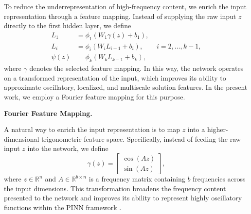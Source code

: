 \documentclass[11pt]{article}
\begin{document}
To reduce the underrepresentation of high-frequency content, we enrich the input representation through a feature mapping. Instead of supplying the raw input \(z\) directly to the first hidden layer, we define
\begin{align}
L_1 &= \phi_1\!\left(W_1 \gamma(z)+b_1\right), \\
L_i &= \phi_i\!\left(W_iL_{i-1}+b_i\right), \qquad i=2,\dots,k-1, \\
\psi(z) &= \phi_k\!\left(W_kL_{k-1}+b_k\right),
\end{align}
where \(\gamma\) denotes the selected feature mapping. In this way, the network operates on a transformed representation of the input, which improves its ability to approximate oscillatory, localized, and multiscale solution features. In the present work, we employ a Fourier feature mapping for this purpose.

\textbf{Fourier Feature Mapping.}

A natural way to enrich the input representation is to map \(z\) into a higher-dimensional trigonometric feature space. Specifically, instead of feeding the raw input \(z\) into the network, we define
\begin{equation}
\gamma(z)=
\begin{bmatrix}
\cos(Az) \\
\sin(Az)
\end{bmatrix},
\end{equation}
where \(z\in\mathbb{R}^{n}\) and \(A\in\mathbb{R}^{b\times n}\) is a frequency matrix containing \(b\) frequencies across the input dimensions. This transformation broadens the frequency content presented to the network and improves its ability to represent highly oscillatory functions within the PINN framework \cite{tancik2020fourier}.
\end{document}

